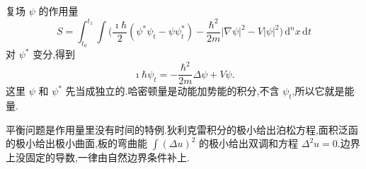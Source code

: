 复场 $\psi$ 的作用量
\begin{equation}
  S=\int_{t_0}^{t_1}\int\Biggl(
    \frac{\imath\hbar}{2}(\psi^*\psi_t-\psi\psi_t^*)
    -\frac{\hbar^2}{2m}|\nabla\psi|^2-V|\psi|^2
  \Biggr)\,\mathrm{d}^n x\,\mathrm{d}t
\end{equation}
对 $\psi^*$ 变分,得到
\begin{equation}
  \imath\hbar\psi_t=-\frac{\hbar^2}{2m}\Delta\psi+V\psi.
\end{equation}
这里 $\psi$ 和 $\psi^*$ 先当成独立的.哈密顿量是动能加势能的积分,不含 $\psi_t$,所以它就是能量.

平衡问题是作用量里没有时间的特例.狄利克雷积分的极小给出泊松方程,面积泛函的极小给出极小曲面,板的弯曲能 $\int(\Delta u)^2$ 的极小给出双调和方程 $\Delta^2 u=0$.边界上没固定的导数,一律由自然边界条件补上.
